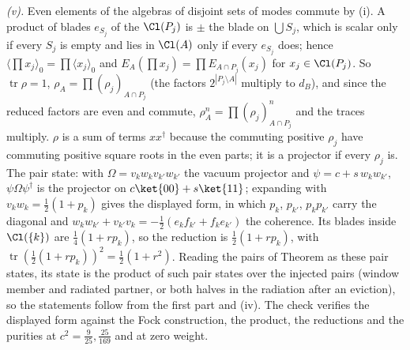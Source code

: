 \emph{(v).} Even elements of the algebras of disjoint sets of modes commute by (i). A product of blades $e_{S_{j}}$ of the $\Cl(P_{j})$ is $\pm$ the blade on $\bigcup S_{j}$, which is scalar only if every $S_{j}$ is empty and lies in $\Cl(A)$ only if every $e_{S_{j}}$ does; hence $\langle\prod x_{j}\rangle_{0} = \prod\langle x_{j}\rangle_{0}$ and $E_{A}(\prod x_{j}) = \prod E_{A \cap P_{j}}(x_{j})$ for $x_{j} \in \Cl(P_{j})$. So $\operatorname{tr}\rho = 1$, $\rho_{A} = \prod(\rho_{j})_{A \cap P_{j}}$ (the factors $2^{|P_{j} \setminus A|}$ multiply to $d_{B}$), and since the reduced factors are even and commute, $\rho_{A}^{n} = \prod(\rho_{j})_{A \cap P_{j}}^{n}$ and the traces multiply. $\rho$ is a sum of terms $xx^{\dagger}$ because the commuting positive $\rho_{j}$ have commuting positive square roots in the even parts; it is a projector if every $\rho_{j}$ is. The pair state: with $\Omega = v_{k}w_{k}v_{k'}w_{k'}$ the vacuum projector and $\psi = c + s\,w_{k}w_{k'}$, $\psi\Omega\psi^{\dagger}$ is the projector on $c\ket{00} + s\ket{11}$; expanding with $v_{k}w_{k} = \tfrac12(1 + p_{k})$ gives the displayed form, in which $p_{k}$, $p_{k'}$, $p_{k}p_{k'}$ carry the diagonal and $w_{k}w_{k'} + v_{k'}v_{k} = -\tfrac12(e_{k}f_{k'} + f_{k}e_{k'})$ the coherence. Its blades inside $\Cl(\{k\})$ are $\tfrac14(1 + rp_{k})$, so the reduction is $\tfrac12(1 + rp_{k})$, with $\operatorname{tr}(\tfrac12(1 + rp_{k}))^{2} = \tfrac12(1 + r^{2})$. Reading the pairs of Theorem  as these pair states, its state is the product of such pair states over the injected pairs (window member and radiated partner, or both halves in the radiation after an eviction), so the statements follow from the first part and (iv). The check verifies the displayed form against the Fock construction, the product, the reductions and the purities at $c^{2} = \tfrac{9}{25}, \tfrac{25}{169}$ and at zero weight.


